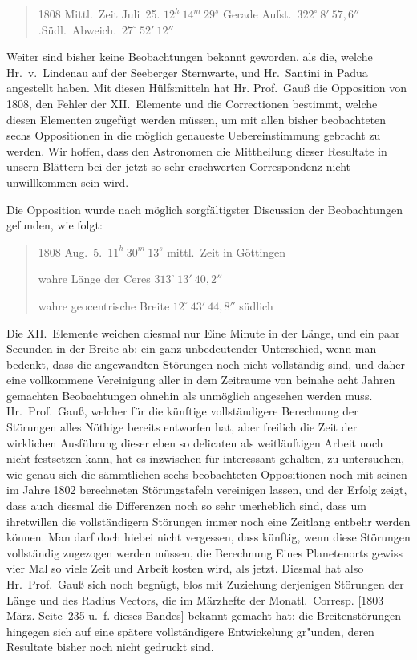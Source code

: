 \documentclass[12pt,a4paper]{book}
\begin{document}
\begin{quote}
1808 Mittl.~Zeit Juli~25. $12^{h}\ 14^{m}\ 29^{s}$ \quad Gerade Aufst.\ $322^{\circ}\ 8'\ 57{,}6''$.\quad S\"udl.~Abweich.\ $27^{\circ}\ 52'\ 12''$
\end{quote}

Weiter sind bisher keine Beobachtungen bekannt geworden, als die, welche Hr.~v.~Lindenau auf der Seeberger Sternwarte, und Hr.~Santini in Padua angestellt haben. Mit diesen H\"ulfsmitteln hat Hr. Prof.~Gau{\ss} die Opposition von 1808, den Fehler der XII.~Elemente und die Correctionen bestimmt, welche diesen Elementen zugef\"ugt werden m\"ussen, um mit allen bisher beobachteten sechs Oppositionen in die m\"oglich genaueste Uebereinstimmung gebracht zu werden. Wir hoffen, dass den Astronomen die Mittheilung dieser Resultate in unsern Bl\"attern bei der jetzt so sehr erschwerten Correspondenz nicht unwillkommen sein wird.

Die Opposition wurde nach m\"oglich sorgf\"altigster Discussion der Beobachtungen gefunden, wie folgt:

\begin{quote}
1808 Aug.~5.\ $11^{h}\ 30^{m}\ 13^{s}$ mittl.~Zeit in G\"ottingen

wahre L\"ange der Ceres \dotfill $313^{\circ}\ 13'\ 40{,}2''$

wahre geocentrische Breite \dotfill $12^{\circ}\ 43'\ 44{,}8''$ s\"udlich
\end{quote}

Die XII.~Elemente weichen diesmal nur Eine Minute in der L\"ange, und ein paar Secunden in der Breite ab: ein ganz unbedeutender Unterschied, wenn man bedenkt, dass die angewandten St\"orungen noch nicht vollst\"andig sind, und daher eine vollkommene Vereinigung aller in dem Zeitraume von beinahe acht Jahren gemachten Beobachtungen ohnehin als unm\"oglich angesehen werden muss. Hr.~Prof.~Gau{\ss}, welcher f\"ur die k\"unftige vollst\"andigere Berechnung der St\"orungen alles N\"othige bereits entworfen hat, aber freilich die Zeit der wirklichen Ausf\"uhrung dieser eben so delicaten als weitl\"auftigen Arbeit noch nicht festsetzen kann, hat es inzwischen f\"ur interessant gehalten, zu untersuchen, wie genau sich die s\"ammtlichen sechs beobachteten Oppositionen noch mit seinen im Jahre 1802 berechneten St\"orungstafeln vereinigen lassen, und der Erfolg zeigt, dass auch diesmal die Differenzen noch so sehr unerheblich sind, dass um ihretwillen die vollst\"andigern St\"orungen immer noch eine Zeitlang entbehr werden k\"onnen. Man darf doch hiebei nicht vergessen, dass k\"unftig, wenn diese St\"orungen vollst\"andig zugezogen werden m\"ussen, die Berechnung Eines Planetenorts gewiss vier Mal so viele Zeit und Arbeit kosten wird, als jetzt. Diesmal hat also Hr.~Prof.~Gau{\ss} sich noch begn\"ugt, blos mit Zuziehung derjenigen St\"orungen der L\"ange und des Radius Vectors, die im M\"arzhefte der Monatl.~Corresp. [1803 M\"arz. Seite~235 u.~f. dieses Bandes] bekannt gemacht hat; die Breitenst\"orungen hingegen sich auf eine sp\"atere vollst\"andigere Entwickelung gr"unden, deren Resultate bisher noch nicht gedruckt sind.
\end{document}
